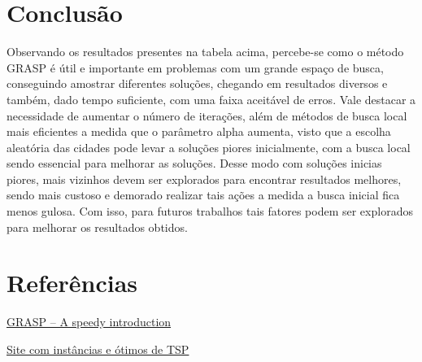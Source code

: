 \documentclass[10pt]{extarticle} %
\begin{document}
\section{Conclusão}

Observando os resultados presentes na tabela acima, percebe-se como o método GRASP é útil e importante em problemas com um grande espaço de busca, conseguindo amostrar diferentes soluções, chegando em resultados diversos e também, dado tempo suficiente, com uma faixa aceitável de erros. Vale destacar a necessidade de aumentar o número de iterações, além de métodos de busca local mais eficientes a medida que o parâmetro alpha aumenta, visto que a escolha aleatória das cidades pode levar a soluções piores inicialmente, com a busca local sendo essencial para melhorar as soluções. Desse modo com soluções inicias piores, mais vizinhos devem ser explorados para encontrar resultados melhores, sendo mais custoso e demorado realizar tais ações a medida a busca inicial fica menos gulosa. Com isso, para futuros trabalhos tais fatores podem ser explorados para melhorar os resultados obtidos.

\section{Referências}

\noindent \href{https://www2.imm.dtu.dk/courses/02719/grasp/grasp.pdf}{GRASP – A speedy introduction}

\noindent \href{http://comopt.ifi.uni-heidelberg.de/software/TSPLIB95/}{Site com instâncias e ótimos de TSP}
\end{document}
